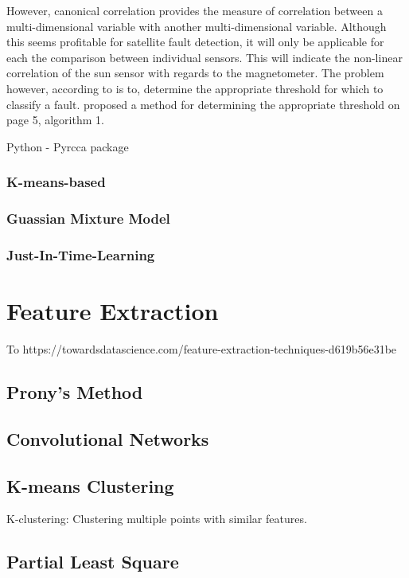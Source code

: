 However, canonical correlation provides the measure of correlation between a multi-dimensional variable with another multi-dimensional variable. Although this seems profitable for satellite fault detection, it will only be applicable for each the comparison between individual sensors. This will indicate the non-linear correlation of the sun sensor with regards to the magnetometer. The problem however, according to \cite{chen2017fault} is to, determine the appropriate threshold for which to classify a fault. \cite{chen2017fault} proposed a method for determining the appropriate threshold on page 5, algorithm 1.
\cite{fukumizu2007statistical}
\cite{zhu2017quality}

Python - Pyrcca package

\subsubsection{K-means-based}
\subsubsection{Guassian Mixture Model}
\subsubsection{Just-In-Time-Learning}
\cite{chen2020just}

\section{Feature Extraction}
To 
https://towardsdatascience.com/feature-extraction-techniques-d619b56e31be
\subsection{Prony's Method}
\subsection{Convolutional Networks}
\subsection{K-means Clustering}
K-clustering: Clustering multiple points with similar features.
\subsection{Partial Least Square}
